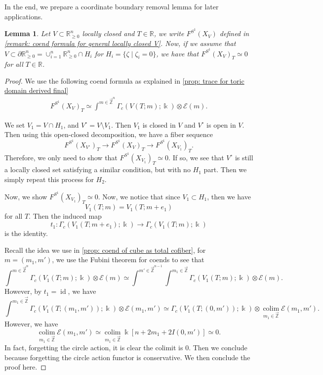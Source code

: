\documentclass[11pt]{amsart}
\numberwithin{equation}{section}
\theoremstyle{plain}
\newtheorem{Lemma}[lemma]{Lemma}
\theoremstyle{definition}
\theoremstyle{remark}
\newcommand{\bR} { {\mathbb{R}}}
\newcommand{\cE} { {\mathcal{E}}}
\newcommand{\id}{{\operatorname{id}}}
\newcommand{\rarbZ} { \overrightarrow{\mathbb{Z}}}
\begin{document}
In the end, we prepare a coordinate boundary removal lemma for later applications. 
\begin{Lemma}\label{lemma: remove coordinate boundary in toric domain}Let $V\subset \bR^n_{\geq 0}$ locally closed and $T\in \bR$, we write $F^{S^1}(X_V)$ defined in \autoref{remark: coend formula for general locally closed V}. Now, if we assume that $V\subset \partial\bR^n_{\geq 0}=\cup_{i=1}^n \bR^n_{\geq 0}\cap H_i$ for $H_i=\{\zeta\mid \zeta_i=0\}$, we have that $F^{S^1}(X_V)_T\simeq 0$ for all $T\in \bR$.
\end{Lemma}
\begin{proof}We use the following coend formula as explained in \autoref{prop: trace for toric domain derived final}
\begin{align*}
    F^{S^1}(X_V)_{T}\simeq \int^{m\in\rarbZ^n} \Gamma_c({ V(T;m)} ;\Bbbk  )\otimes \cE(m).
\end{align*}

We set $V_1=V\cap H_1$, and $V^\circ=V\setminus V_1$. Then $V_1$ is closed in $V$ and $V^\circ$ is open in $V$. Then using this open-closed decomposition, we have a fiber sequence
\[F^{S^1}(X_{V^\circ})_{T}\to F^{S^1}(X_{V})_{T}\to F^{S^1}(X_{V_1})_{T}.\]
Therefore, we only need to show that $F^{S^1}(X_{V_1})_{T}\simeq 0$. If so, we see that $V^\circ$ is still a locally closed set satisfying a similar condition, but with no $H_1$ part. Then we simply repeat this process for $H_2$.

Now, we show $F^{S^1}(X_{V_1})_{T}\simeq 0$. Now, we notice that since $V_1\subset H_1$, then we have
\[V_1(T;m)=V_1(T;m+e_1)\]
for all $T$. Then the induced map
\[t_1:\Gamma_c({ V_1(T;m+e_1)} ;\Bbbk  )\to \Gamma_c({ V_1(T;m)} ;\Bbbk  )  \]
is the identity.

Recall the idea we use in \autoref{prop: coend of cube as total cofiber}, for $m=(m_1,m')$, we use the Fubini theorem for coends to see that
\[\int^{m\in\rarbZ^n} \Gamma_c({ V_1(T;m)} ;\Bbbk  )\otimes \cE(m)\simeq \int^{m'\in\rarbZ^{n-1}} \int^{m_1\in \rarbZ}\Gamma_c({ V_1(T;m)} ;\Bbbk  )\otimes \cE(m).\]
However, by $t_1=\id$, we have
\[
\int^{m_1\in\rarbZ}
\Gamma_c(V_1(T;(m_1,m'));\Bbbk)\otimes\cE(m_1,m')
\simeq
\Gamma_c(V_1(T;(0,m'));\Bbbk)
\otimes
\operatorname*{colim}_{m_1\in\rarbZ}\cE(m_1,m').
\]
However, we have
\[\operatorname*{colim}_{m_1\in\rarbZ}\cE(m_1,m')\simeq \operatorname*{colim}_{m_1\in\rarbZ}\Bbbk[n+2m_1+2I(0,m')] \simeq 0.\]
In fact, forgetting the circle action, it is clear the colimit is $0$. Then we conclude because forgetting the circle action functor is conservative. We then conclude the proof here.
\end{proof}
\end{document}
